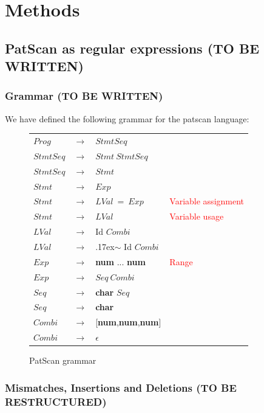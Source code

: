 \documentclass[12pt]{article}
\theoremstyle{definition}
\begin{document}
\newpage

\section{Methods}
\subsection{PatScan as regular expressions (TO BE WRITTEN)}

\subsubsection{Grammar (TO BE WRITTEN)}
\label{Patscan grammar}

We have defined the following grammar for the patscan language:

\begin{figure}[H]
\begin{tabular}{|lcll|}
	\hline
	$Prog$ & $\rightarrow$ & $StmtSeq$ & \\
	$StmtSeq$ & $\rightarrow$ & $Stmt\ StmtSeq$ & \\
	$StmtSeq$ & $\rightarrow$ & $Stmt$ & \\
	$Stmt$ & $\rightarrow$ & $Exp$ & \\
	$Stmt$ & $\rightarrow$ & $LVal\ =\ Exp$ &  \textcolor{red}{Variable assignment} \\
	$Stmt$ & $\rightarrow$ & $LVal$ & \textcolor{red}{Variable usage} \\
	$LVal$ & $\rightarrow$ & Id $Combi$ & \\
	$LVal$ & $\rightarrow$ & {\raise.17ex\hbox{$\scriptstyle\mathtt{\sim}$}} Id $Combi$ & \\
	$Exp$ & $\rightarrow$ & \textbf{num} ... \textbf{num} & \textcolor{red}{Range} \\
	$Exp$ & $\rightarrow$ & $Seq\ Combi$ & \\
	$Seq$ & $\rightarrow$ & \textbf{char} $Seq$ & \\
	$Seq$ & $\rightarrow$ & \textbf{char} & \\
	$Combi$ & $\rightarrow$ & [\textbf{num},\textbf{num},\textbf{num}] & \\
	$Combi$ & $\rightarrow$ & $\epsilon$ & \\
	\hline
\end{tabular}
\caption{PatScan grammar}
\end{figure}

\subsubsection{Mismatches, Insertions and Deletions (TO BE RESTRUCTURED)}
\end{document}
